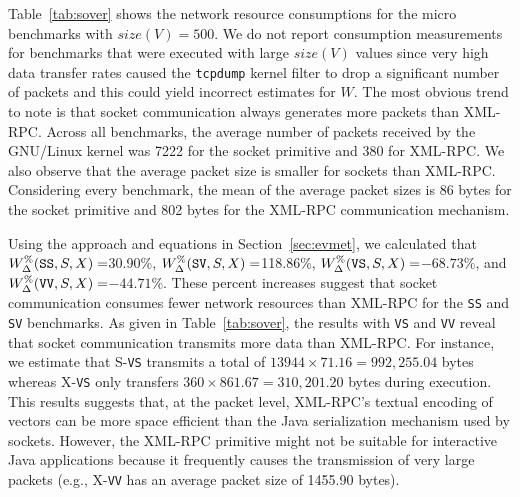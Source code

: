 \documentclass{sig-alternate}
\begin{document}

Table~\ref{tab:sover} shows the network resource consumptions for the
micro benchmarks with $size(V) = 500$.  We do not report consumption
measurements for benchmarks that were executed with large $size(V)$
values since very high data transfer rates caused the {\tt tcpdump}
kernel filter to drop a significant number of packets and this could
yield incorrect estimates for $W$.  The most obvious trend to note is
that socket communication always generates more packets than XML-RPC.
Across all benchmarks, the average number of packets received by the
GNU/Linux kernel was 7222 for the socket primitive and 380 for
XML-RPC. We also observe that the average packet size is smaller for
sockets than XML-RPC.  Considering every benchmark, the mean of the
average packet sizes is 86 bytes for the socket primitive and 802
bytes for the XML-RPC communication mechanism.








Using the approach and equations in Section~\ref{sec:evmet}, we
calculated that {\small $W_\Delta^\%(\mbox{{\tt SS}},S,X)=$}30.90\%,
{\small $W_\Delta^\%({\tt SV},S,X)=$}118.86\%, {\small
  $W_\Delta^\%(\mbox{{\tt VS}},S,X)=$}$-68.73\%$, and {\small
  $W_\Delta^\%(\mbox{{\tt VV}},S,X) =$}$-44.71\%$.  These percent
increases suggest that socket communication consumes fewer network
resources than XML-RPC for the \texttt{SS} and \texttt{SV} benchmarks.
As given in Table~\ref{tab:sover}, the results with \texttt{VS} and
\texttt{VV} reveal that socket communication transmits more data than
XML-RPC.  For instance, we estimate that S-{\tt VS} transmits a total
of $13944 \times 71.16 = 992,255.04$ bytes whereas X-{\tt VS} only
transfers $360 \times 861.67 = 310,201.20$ bytes during execution.
This results suggests that, at the packet level, XML-RPC's textual
encoding of vectors can be more space efficient than the Java
serialization mechanism used by sockets.  However, the XML-RPC
primitive might not be suitable for interactive Java applications
because it frequently causes the transmission of very large packets
(e.g., X-{\tt VV} has an average packet size of 1455.90 bytes).
\end{document}
